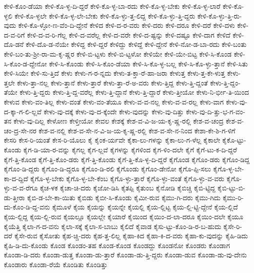 {ಕೇಳಿ-ಕೊಂ-ಡೆಯಾ
ಕೇಳಿ-ಕೊ-ಳ್ಳ-ದಿ-ದ್ದರೆ
ಕೇಳಿ-ಕೊ-ಳ್ಳ-ಬಾ-ರದು
ಕೇಳಿ-ಕೊ-ಳ್ಳ-ಬೇಕು
ಕೇಳಿ-ಕೊ-ಳ್ಳ-ಲಾರೆ
ಕೇಳಿ-ಕೊ-ಳ್ಳಲಿ
ಕೇಳಿ-ಕೊ-ಳ್ಳಲೇ
ಕೇಳಿ-ಕೊ-ಳ್ಳ-ಲೇ-ಬೇಕು
ಕೇಳಿ-ಕೊ-ಳ್ಳು-ತ್ತ-ಲಿದ್ದ
ಕೇಳಿ-ಕೊ-ಳ್ಳು-ತ್ತಿ-ದ್ದರು
ಕೇಳಿ-ಕೊ-ಳ್ಳು-ತ್ತಿ-ರು-ವುದು
ಕೇಳಿ-ಕೊ-ಳ್ಳೋ-ಣ-ವೆಂ-ದಿ-ದ್ದೇನೆ
ಕೇಳಿದ
ಕೇಳಿ-ದ-ರ-ವರು
ಕೇಳಿ-ದರು
ಕೇಳಿ-ದರೂ
ಕೇಳಿ-ದರೆ
ಕೇಳಿ-ದಳು
ಕೇಳಿ-ದ-ವ-ರಿಗೆ
ಕೇಳಿ-ದ-ವ-ರಿ-ಗೆಲ್ಲ
ಕೇಳಿ-ದ-ವರೆಲ್ಲ
ಕೇಳಿ-ದ-ವರೇ
ಕೇಳಿ-ದ-ಷ್ಟನ್ನು
ಕೇಳಿ-ದಷ್ಟೂ
ಕೇಳಿ-ದಾಗ
ಕೇಳಿದೆ
ಕೇಳಿ-ದೊ-ಡನೆ
ಕೇಳಿ-ದೊ-ಡ-ನೆಯೇ
ಕೇಳಿದ್ದ
ಕೇಳಿ-ದ್ದರೆ
ಕೇಳಿದ್ದು
ಕೇಳಿದ್ದೆ
ಕೇಳಿ-ದ್ದೇನೆ
ಕೇಳಿ-ನೋ-ಡ-ಬಾ-ರದು
ಕೇಳಿ-ಬಂತು
ಕೇಳಿ-ಬಂ-ತು-ಶ್ರೀ-ರಾ-ಮ-ಕೃ-ಷ್ಣರ
ಕೇಳಿ-ಬಿ-ಟ್ಟಳು
ಕೇಳಿ-ಬಿ-ಟ್ಟಳೋ
ಕೇಳಿಯೇ
ಕೇಳಿ-ಯೇ-ಬಿಟ್ಟ
ಕೇಳಿ-ಸಿ-ಕೊಂಡ
ಕೇಳಿ-ಸಿ-ಕೊಂ-ಡ-ದ್ದೇನೋ
ಕೇಳಿ-ಸಿ-ಕೊಂಡು
ಕೇಳಿ-ಸಿ-ಕೊಂ-ಡೆಯಾ
ಕೇಳಿ-ಸಿ-ಕೊ-ಳ್ಳ-ಬಲ್ಲ
ಕೇಳಿ-ಸಿ-ಕೊ-ಳ್ಳು-ತ್ತಾನೆ
ಕೇಳಿ-ಸಿತು
ಕೇಳಿ-ಸಿಯೇ
ಕೇಳಿ-ಸು-ತ್ತಿದೆ
ಕೇಳು
ಕೇಳು-ಗ-ರ-ನ್ನದು
ಕೇಳು-ತ-ಕ್ತಾ-ರೆ-ಹಾ-ಜರಾ
ಕೇಳುತ್ತ
ಕೇಳು-ತ್ತ-ಕೇ-ಳುತ್ತ
ಕೇಳು-ತ್ತಲೇ
ಕೇಳು-ತ್ತಾ-ನಲ್ಲ
ಕೇಳು-ತ್ತಾನೆ
ಕೇಳು-ತ್ತಾರೆ
ಕೇಳು-ತ್ತಾ-ರೆ-ಅ-ವರು
ಕೇಳು-ತ್ತಿದ್ದ
ಕೇಳು-ತ್ತಿ-ದ್ದಂತೆ
ಕೇಳು-ತ್ತಿ-ದ್ದಂ-ತೆಯೇ
ಕೇಳು-ತ್ತಿ-ದ್ದರು
ಕೇಳು-ತ್ತಿ-ದ್ದ-ವರೆಲ್ಲ
ಕೇಳು-ತ್ತಿ-ದ್ದಾನೆ
ಕೇಳು-ತ್ತಿ-ದ್ದಾರೆ
ಕೇಳು-ತ್ತೀಯೋ
ಕೇಳು-ನಿ-ರ್ಭೀ-ತಿ-ಯಿಂದ
ಕೇಳುವ
ಕೇಳು-ವಂ-ತಿಲ್ಲ
ಕೇಳು-ವಂತೆ
ಕೇಳು-ವಂ-ತೆಯೂ
ಕೇಳು-ವ-ವ-ನಲ್ಲ
ಕೇಳು-ವ-ವ-ರಲ್ಲ
ಕೇಳು-ವಾಗ
ಕೇಳು-ವು-ದ-ಕ್ಕಾ-ಗ-ಲಿ-ಲ್ಲವೆ
ಕೇಳು-ವು-ದಕ್ಕೆ
ಕೇಳು-ವು-ದ-ಕ್ಕೆಂದೇ
ಕೇಳು-ವುದನ್ನು
ಕೇಳು-ವು-ದಿತ್ತು
ಕೇಳು-ವು-ದಿ-ತ್ತು-ಭ-ಗ-ವಂ-ತನ
ಕೇಳು-ವು-ದಿಲ್ಲ
ಕೇಳೋಣ
ಕೇಳ್ತೀಯೋ
ಕೇವಲ
ಕೇಶಕ್ಕೆ
ಕೇಶ-ವ-ವಿ-ಜ-ಯ-ಕೃ-ಷ್ಣ-ರಲ್ಲಿ
ಕೇಶ-ವ-ಚಂದ್ರ
ಕೇಶ-ವ-ಚಂ-ದ್ರ-ಸೇ-ನರ
ಕೇಶ-ವ-ನಲ್ಲಿ
ಕೇಶ-ವ-ಸೇ-ನ-ವಿ-ಜ-ಯ-ಕೃ-ಷ್ಣ-ರಲ್ಲಿ
ಕೇಶ-ವ-ಸೇ-ನ-ನಿಂದ
ಕೇಶಾ-ಕೇ-ಶಿ-ಗ-ಳಿಗೆ
ಕೇಸರಿ
ಕೇಸ-ರಿ-ಯಂತೆ
ಕೇಸ-ರಿ-ಯೊಲು
ಕೈ
ಕೈಂಕ-ರ್ಯವೇ
ಕೈಕಾ-ಲು-ಗಳನ್ನು
ಕೈಕಾ-ಲು-ಗ-ಳೆಲ್ಲ
ಕೈಕಾಲೇ
ಕೈಕೊ-ಟ್ಟು-ಕೊಂಡು
ಕೈಗ-ಡಿ-ಯಾ-ರ-ವನ್ನು
ಕೈಗಲ್ಲ
ಕೈಗ-ಲ್ಲವೆ
ಕೈಗಳನ್ನು
ಕೈಗಳಿಂದ
ಕೈಗ-ಳಿಂ-ದಲೇ
ಕೈಗೆ
ಕೈಗೆ-ಟು-ಕ-ದಿ-ದ್ದರೆ
ಕೈಗೆ-ತ್ತಿ-ಕೊಂಡ
ಕೈಗೆ-ತ್ತಿ-ಕೊಂ-ಡರು
ಕೈಗೆ-ತ್ತಿ-ಕೊಂಡು
ಕೈಗೆ-ತ್ತಿ-ಕೊ-ಳ್ಳ-ದಿ-ದ್ದರೆ
ಕೈಗೊಂಡ
ಕೈಗೊಂ-ಡರು
ಕೈಗೊಂ-ಡಿದ್ದ
ಕೈಗೊಂ-ಡಿ-ದ್ದರು
ಕೈಗೊಂ-ಡಿ-ದ್ದರೂ
ಕೈಗೊಂ-ಡಿ-ರಲಿ
ಕೈಗೊಂಡು
ಕೈಗೊಂ-ಡೇನೋ
ಕೈಗೊ-ಪ್ಪಿ-ಸಲು
ಕೈಗೊ-ಳ್ಳ-ಬೇ-ಕಾ-ದ-ದ್ದಿದೆ
ಕೈಗೊ-ಳ್ಳ-ಬೇಕು
ಕೈಗೊ-ಳ್ಳ-ಬೇ-ಕೆಂಬ
ಕೈಗೊ-ಳ್ಳು-ತ್ತಾರೆ
ಕೈಗೊ-ಳ್ಳು-ವಂತೆ
ಕೈಗೊ-ಳ್ಳು-ವ-ವರು
ಕೈಗೊ-ಳ್ಳು-ವ-ವ-ರೆಗೂ
ಕೈಚ-ಳಕ
ಕೈಚಾ-ಚಿ-ದರು
ಕೈಜೋ-ಡಿಸಿ
ಕೈತಪ್ಪಿ
ಕೈತುಂಬ
ಕೈನೋಡಿ
ಕೈಬಿಚ್ಚಿ
ಕೈಬಿ-ಟ್ಟಿದ್ದ
ಕೈಬಿ-ಟ್ಟು-ಬಿ-ಡು-ತ್ತೀರಾ
ಕೈಬಿ-ಡ-ಬೇ-ಕಾ-ಯಿತು
ಕೈಬಿಡು
ಕೈಬೀ-ಸಿ-ಕೊಂಡು
ಕೈಮೀ-ರುವ
ಕೈಮು-ಗಿ-ದರು
ಕೈಮು-ಗಿದು
ಕೈಮು-ರಿ-ದು-ಕೊಂ-ಡಿ-ದ್ದ-ವನು
ಕೈಮೂಳೆ
ಕೈಯ
ಕೈಯನ್ನು
ಕೈಯನ್ನೇ
ಕೈಯಲ್ಲಿ
ಕೈಯ-ಲ್ಲಿಟ್ಟ
ಕೈಯ-ಲ್ಲಿ-ಟ್ಟಿ-ದ್ದೇನೆ
ಕೈಯ-ಲ್ಲಿದೆ
ಕೈಯ-ಲ್ಲಿದ್ದ
ಕೈಯ-ಲ್ಲಿ-ರುವ
ಕೈಯಲ್ಲೂ
ಕೈಯಲ್ಲೇ
ಕೈಯಾರೆ
ಕೈಯಿಂದ
ಕೈಯಿಂ-ದ-ಲಾ-ದರೂ
ಕೈಯಿಂ-ದಲೇ
ಕೈಯೂ
ಕೈಯೆತ್ತಿ
ಕೈಲಾ-ಗ-ದ-ವನು
ಕೈಲಾ-ಸಕ್ಕೆ
ಕೈಲಾ-ಸ-ಬಾಬು
ಕೈಲಿದೆ
ಕೈವಾಡ
ಕೈಸು-ಟ್ಟು-ಕೊಂ-ಡಿ-ರ-ಬ-ಹುದು
ಕೈಸೇ-ರಿ-ದರೆ
ಕೈಸೇ-ರುವ
ಕೈಸೋತು
ಕೈಹ-ಚ್ಚಿ-ದರು
ಕೈಹ-ತ್ತ-ಲಿಲ್ಲ
ಕೈಹಾ-ಕಿದ
ಕೈಹಾ-ಕಿ-ದ-ವರು
ಕೈಹಾ-ಕು-ವುದನ್ನು
ಕೈಹಿ-ಡಿದು
ಕೈಹಿ-ಡಿ-ದು-ಕೊಂಡು
ಕೊಂಡ
ಕೊಂಡಂ-ತಹ
ಕೊಂಡ-ಕೊಂಡ
ಕೊಂಡದ್ದು
ಕೊಂಡನೋ
ಕೊಂಡರು
ಕೊಂಡಾಗ
ಕೊಂಡಾ-ಡಿ-ದರು
ಕೊಂಡಾ-ಡುತ್ತ
ಕೊಂಡಾ-ಡು-ತ್ತಾರೆ
ಕೊಂಡಾ-ಡು-ತ್ತಿ-ದ್ದರು
ಕೊಂಡಾ-ಡುವ
ಕೊಂಡಾ-ಡು-ವು-ದೇನು
ಕೊಂಡಾರು
ಕೊಂಡಾ-ರೆಯೆ
ಕೊಂಡಿತು
ಕೊಂಡಿತ್ತು
}
